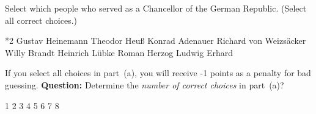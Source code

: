 \documentclass{article}
\begin{document}
\begin{quiz*}{\currQuiz}
\begin{questions}
\begin{questions}
\rowsep{3pt}

        \item{} Select which people who served as a Chancellor of the
            German Republic. (Select all correct choices.)
        \begin{manswers}*{2}%
            \bChoices[2]
                 Gustav Heinemann\eAns
                 Theodor Heu{\ss}\eAns
                 Konrad Adenauer\eAns
                 Richard von Weizs\"{a}cker\eAns
                 Willy Brandt\eAns
                 Heinrich L\"{u}bke\eAns
                 Roman Herzog\eAns
                 Ludwig Erhard\eAns
            \eChoices
        \end{manswers}

\rowsep{3pt}

      \item{} If you select all choices in part~(a), you will
          receive -1 points as a penalty for bad guessing. \textbf{Question:}
          Determine the \emph{number of correct choices} in part~(a)?
          \begin{answers}{4}
          \bChoices
             1\eAns
             2\eAns
             3\eAns
             4\eAns
             5\eAns
             6\eAns
             7\eAns
             8\eAns
          \eChoices
          \end{answers}
    \end{questions}


\end{questions}
\writeProListAux
\end{quiz*}\quad\thQuizTrailer
\end{document}
